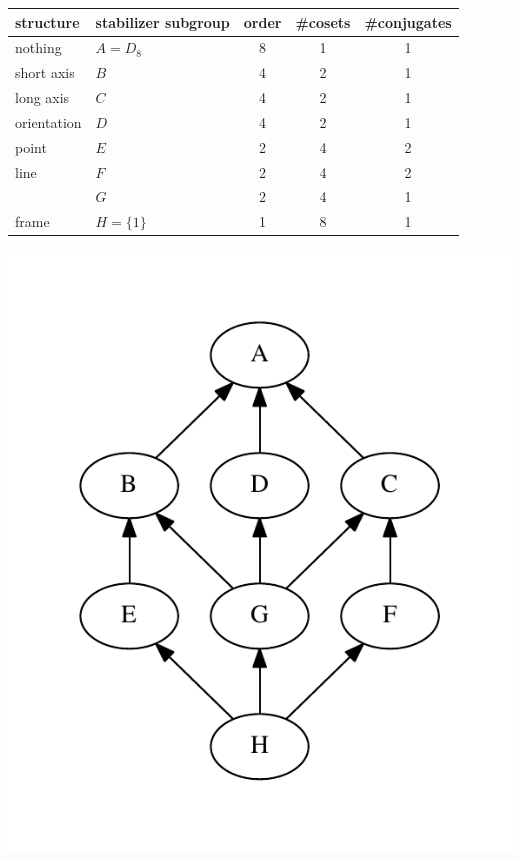 \documentclass[11pt,oneside]{article}
\begin{document}
\begin{samepage}
\begin{center}
\begin{tabular}{ |l|l|c|c|c| }
\hline
structure & stabilizer subgroup & order & \#cosets & \#conjugates \\
\hline
\hline
nothing & $A=D_8$ &       8        &  1      &   1         \\
\hline
short axis& $B$ &       4        &  2      &   1         \\
\hline
long axis & $C$ &       4        &  2      &   1         \\
\hline
orientation & $D$ &       4        &  2      &   1         \\
\hline
point & $E$ &       2        &  4      &   2         \\
\hline
line  & $F$ &       2        &  4      &   2         \\
\hline
        & $G$ &       2        &  4      &   1         \\
\hline
frame & $H=\{1\} $ &       1        &  8      &   1         \\
\hline
\end{tabular}
\end{center}
\end{samepage}

\begin{center}
\includegraphics[width=0.4\columnwidth]{subgroups_d8.pdf} 
\end{center}

\end{document}

